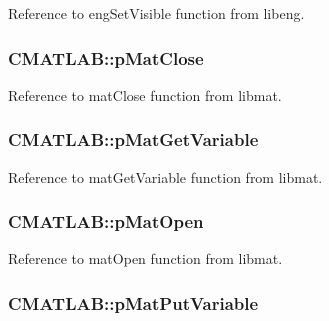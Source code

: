 Reference to eng\-Set\-Visible function from libeng. 

\hypertarget{class_c_m_a_t_l_a_b_a7ec5b3aaa23c3aeac50d7e5e3d0a9dc2}{
\subsubsection[{p\-Mat\-Close}]{ C\-M\-A\-T\-L\-A\-B\-::p\-Mat\-Close\hspace{0.3cm}{\ttfamily [private]}}}\label{class_c_m_a_t_l_a_b_a7ec5b3aaa23c3aeac50d7e5e3d0a9dc2}


Reference to mat\-Close function from libmat. 

\hypertarget{class_c_m_a_t_l_a_b_a67cb7321930f1e73b6b75a461c93316e}{
\subsubsection[{p\-Mat\-Get\-Variable}]{ C\-M\-A\-T\-L\-A\-B\-::p\-Mat\-Get\-Variable\hspace{0.3cm}{\ttfamily [private]}}}\label{class_c_m_a_t_l_a_b_a67cb7321930f1e73b6b75a461c93316e}


Reference to mat\-Get\-Variable function from libmat. 

\hypertarget{class_c_m_a_t_l_a_b_a6c18b950cb8dbfbba72589e44db1f69e}{
\subsubsection[{p\-Mat\-Open}]{ C\-M\-A\-T\-L\-A\-B\-::p\-Mat\-Open\hspace{0.3cm}{\ttfamily [private]}}}\label{class_c_m_a_t_l_a_b_a6c18b950cb8dbfbba72589e44db1f69e}


Reference to mat\-Open function from libmat. 

\hypertarget{class_c_m_a_t_l_a_b_ac8ce0e267d00131b74994e825f1bdaa7}{
\subsubsection[{p\-Mat\-Put\-Variable}]{ C\-M\-A\-T\-L\-A\-B\-::p\-Mat\-Put\-Variable\hspace{0.3cm}{\ttfamily [private]}}}\label{class_c_m_a_t_l_a_b_ac8ce0e267d00131b74994e825f1bdaa7}


